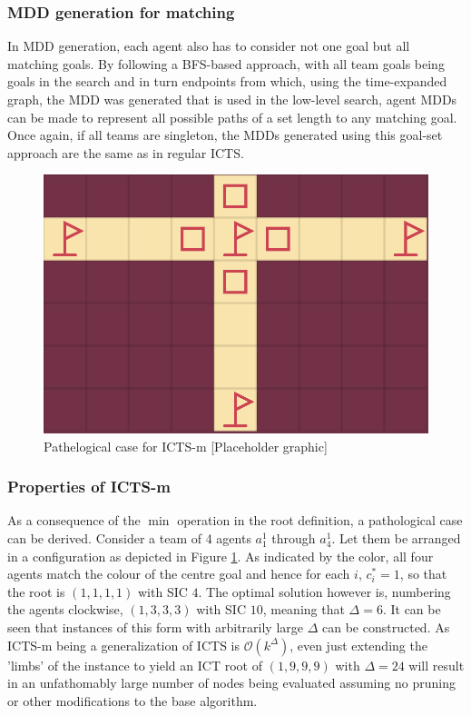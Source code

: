 \documentclass[english]{article}
\begin{document}
	\subsubsection{MDD generation for matching}
	In MDD generation, each agent also has to consider not one goal but all matching goals. By following a BFS-based approach, with all team goals being goals in the search and in turn endpoints from which, using the time-expanded graph, the MDD was generated that is used in the low-level search, agent MDDs can be made to represent all possible paths of a set length to any matching goal. Once again, if all teams are singleton, the MDDs generated using this goal-set approach are the same as in regular ICTS.
	\begin{figure}
		\centering
		\includegraphics[width=\linewidth]{img/path}
		\caption{Pathelogical case for ICTS-m [Placeholder graphic]}
		\label{fig:path}
	\end{figure}
	\subsubsection{Properties of ICTS-m}
	As a consequence of the $\min$ operation in the root definition, a pathological case can be derived. Consider a team of 4 agents $a_1^1$ through $a_4^1$. Let them be arranged in a configuration as depicted in Figure \ref{fig:path}. As indicated by the color, all four agents match the colour of the centre goal and hence for each $i$, $c^*_i = 1$, so that the root is $(1,1,1,1)$ with SIC $4$. The optimal solution however is, numbering the agents clockwise, $(1,3,3,3)$ with SIC $10$, meaning that $\Delta = 6$. It can be seen that instances of this form with arbitrarily large $\Delta$ can be constructed. As ICTS-m being a generalization of ICTS is $\mathcal{O}(k^\Delta)$, even just extending the 'limbs' of the instance to yield an ICT root of $(1,9,9,9)$ with $\Delta = 24$ will result in an unfathomably large number of nodes being evaluated assuming no pruning or other modifications to the base algorithm.
\end{document}
